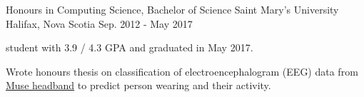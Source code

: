 

\begin{cventries}

  \cventry
    {Honours in Computing Science, Bachelor of Science} %
    {Saint Mary's University} %
    {Halifax, Nova Scotia} %
    {Sep. 2012 - May 2017} %
    {
      \begin{cvitems} %
        \item { student with 3.9 / 4.3 GPA and graduated in May 2017.}
        \item {Wrote honours thesis on classification of electroencephalogram (EEG) data from \href{http://www.choosemuse.com/}{Muse headband} to predict person wearing and their activity.}
      \end{cvitems}
    }

\end{cventries}
